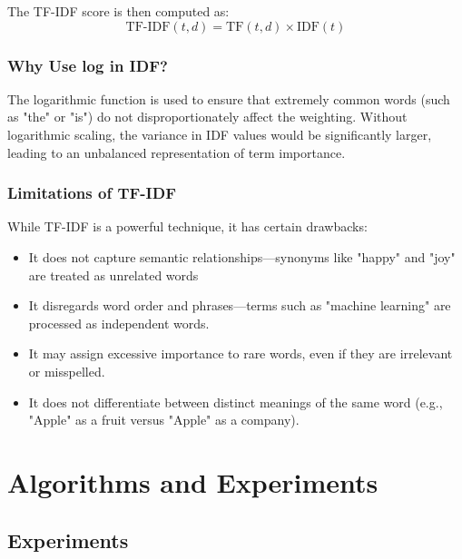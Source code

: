 \documentclass[12pt]{fphw}
\begin{document}
The TF-IDF score is then computed as:
\[
\text{TF-IDF}(t, d) = \text{TF}(t, d) \times \text{IDF}(t)
\]

\subsubsection{Why Use log in IDF?}

The logarithmic function is used to ensure that extremely common words (such as "the" or "is") do not disproportionately affect the weighting. Without logarithmic scaling, the variance in IDF values would be significantly larger, leading to an unbalanced representation of term importance.

\subsubsection{Limitations of TF-IDF}

While TF-IDF is a powerful technique, it has certain drawbacks:
\begin{itemize}
    \item It does not capture semantic relationships—synonyms like "happy" and "joy" are treated as unrelated words
    \item It disregards word order and phrases—terms such as "machine learning" are processed as independent words.
    \item It may assign excessive importance to rare words, even if they are irrelevant or misspelled.
    \item It does not differentiate between distinct meanings of the same word (e.g., "Apple" as a fruit versus "Apple" as a company).
\end{itemize}


\section{Algorithms and Experiments}

\subsection{Experiments}
\end{document}
